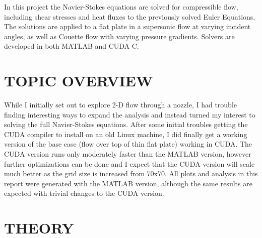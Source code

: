 \documentclass[10pt,a4paper]{article}
\begin{document}
In this project the Navier-Stokes equations are solved for compressible flow, including shear stresses and heat fluxes to the previously solved Euler Equations. The solutions are applied to a flat plate in a supersonic flow at varying incident angles, as well as Couette flow with varying pressure gradients. Solvers are developed in both MATLAB and CUDA C.


\thispagestyle{empty} %

\newpage

\setcounter{page}{1}


\section*{TOPIC OVERVIEW}

While I initially set out to explore 2-D flow through a nozzle, I had trouble finding interesting ways to expand the analysis and instead turned my interest to solving the full Navier-Stokes equations. After some initial troubles getting the CUDA compiler to install on an old Linux machine, I did finally get a working version of the base case (flow over top of thin flat plate) working in CUDA. The CUDA version runs only moderately faster than the MATLAB version, however further optimizations can be done and I expect that the CUDA version will scale much better as the grid size is increased from 70x70. All plots and analysis in this report were generated with the MATLAB version, although the same results are expected with trivial changes to the CUDA version.



\section*{THEORY}
\end{document}
